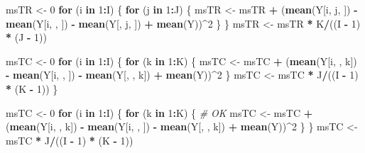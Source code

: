 \documentclass[
]{book}
\newenvironment{Shaded}{\begin{snugshade}}{\end{snugshade}}
\newcommand{\CommentTok}[1]{\textcolor[rgb]{0.56,0.35,0.01}{\textit{#1}}}
\newcommand{\ControlFlowTok}[1]{\textcolor[rgb]{0.13,0.29,0.53}{\textbf{#1}}}
\newcommand{\DecValTok}[1]{\textcolor[rgb]{0.00,0.00,0.81}{#1}}
\newcommand{\KeywordTok}[1]{\textcolor[rgb]{0.13,0.29,0.53}{\textbf{#1}}}
\newcommand{\NormalTok}[1]{#1}
\newcommand{\OperatorTok}[1]{\textcolor[rgb]{0.81,0.36,0.00}{\textbf{#1}}}
\newcommand{\StringTok}[1]{\textcolor[rgb]{0.31,0.60,0.02}{#1}}
\begin{document}
\begin{Shaded}
\begin{Highlighting}[]
\NormalTok{msTR \textless{}{-}}\StringTok{ }\DecValTok{0}
\ControlFlowTok{for}\NormalTok{ (i }\ControlFlowTok{in} \DecValTok{1}\OperatorTok{:}\NormalTok{I) \{}
  \ControlFlowTok{for}\NormalTok{ (j }\ControlFlowTok{in} \DecValTok{1}\OperatorTok{:}\NormalTok{J) \{}
\NormalTok{    msTR \textless{}{-}}\StringTok{ }\NormalTok{msTR }\OperatorTok{+}\StringTok{ }
\StringTok{      }\NormalTok{(}\KeywordTok{mean}\NormalTok{(Y[i, j, ]) }\OperatorTok{{-}}\StringTok{ }\KeywordTok{mean}\NormalTok{(Y[i, , ]) }\OperatorTok{{-}}\StringTok{ }\KeywordTok{mean}\NormalTok{(Y[, j, ]) }\OperatorTok{+}\StringTok{ }\KeywordTok{mean}\NormalTok{(Y))}\OperatorTok{\^{}}\DecValTok{2}
\NormalTok{  \}}
\NormalTok{\}}
\NormalTok{msTR \textless{}{-}}\StringTok{ }\NormalTok{msTR }\OperatorTok{*}\StringTok{ }\NormalTok{K}\OperatorTok{/}\NormalTok{((I }\OperatorTok{{-}}\StringTok{ }\DecValTok{1}\NormalTok{) }\OperatorTok{*}\StringTok{ }\NormalTok{(J }\OperatorTok{{-}}\StringTok{ }\DecValTok{1}\NormalTok{))}

\NormalTok{msTC \textless{}{-}}\StringTok{ }\DecValTok{0}
\ControlFlowTok{for}\NormalTok{ (i }\ControlFlowTok{in} \DecValTok{1}\OperatorTok{:}\NormalTok{I) \{}
  \ControlFlowTok{for}\NormalTok{ (k }\ControlFlowTok{in} \DecValTok{1}\OperatorTok{:}\NormalTok{K) \{}
\NormalTok{    msTC \textless{}{-}}\StringTok{ }\NormalTok{msTC }\OperatorTok{+}\StringTok{ }
\StringTok{      }\NormalTok{(}\KeywordTok{mean}\NormalTok{(Y[i, , k]) }\OperatorTok{{-}}\StringTok{ }\KeywordTok{mean}\NormalTok{(Y[i, , ]) }\OperatorTok{{-}}\StringTok{ }\KeywordTok{mean}\NormalTok{(Y[, , k]) }\OperatorTok{+}\StringTok{ }\KeywordTok{mean}\NormalTok{(Y))}\OperatorTok{\^{}}\DecValTok{2}
\NormalTok{  \}}
\NormalTok{  msTC \textless{}{-}}\StringTok{ }\NormalTok{msTC }\OperatorTok{*}\StringTok{ }\NormalTok{J}\OperatorTok{/}\NormalTok{((I }\OperatorTok{{-}}\StringTok{ }\DecValTok{1}\NormalTok{) }\OperatorTok{*}\StringTok{ }\NormalTok{(K }\OperatorTok{{-}}\StringTok{ }\DecValTok{1}\NormalTok{))}
\NormalTok{\} }

\NormalTok{msTC \textless{}{-}}\StringTok{ }\DecValTok{0}
\ControlFlowTok{for}\NormalTok{ (i }\ControlFlowTok{in} \DecValTok{1}\OperatorTok{:}\NormalTok{I) \{}
  \ControlFlowTok{for}\NormalTok{ (k }\ControlFlowTok{in} \DecValTok{1}\OperatorTok{:}\NormalTok{K) \{ }\CommentTok{\# OK}
\NormalTok{    msTC \textless{}{-}}\StringTok{ }\NormalTok{msTC }\OperatorTok{+}\StringTok{ }
\StringTok{      }\NormalTok{(}\KeywordTok{mean}\NormalTok{(Y[i, , k]) }\OperatorTok{{-}}\StringTok{ }\KeywordTok{mean}\NormalTok{(Y[i, , ]) }\OperatorTok{{-}}\StringTok{ }\KeywordTok{mean}\NormalTok{(Y[, , k]) }\OperatorTok{+}\StringTok{ }\KeywordTok{mean}\NormalTok{(Y))}\OperatorTok{\^{}}\DecValTok{2}
\NormalTok{  \}}
\NormalTok{\}}
\NormalTok{msTC \textless{}{-}}\StringTok{ }\NormalTok{msTC }\OperatorTok{*}\StringTok{ }\NormalTok{J}\OperatorTok{/}\NormalTok{((I }\OperatorTok{{-}}\StringTok{ }\DecValTok{1}\NormalTok{) }\OperatorTok{*}\StringTok{ }\NormalTok{(K }\OperatorTok{{-}}\StringTok{ }\DecValTok{1}\NormalTok{))}


\end{Highlighting}
\end{Shaded}
\end{document}
